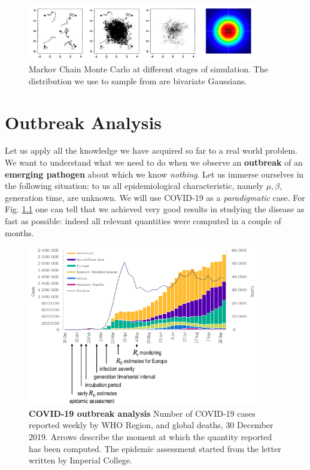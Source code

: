 \documentclass[../main/main.tex]{subfiles}
\begin{document}
\begin{figure}[h!]
\centering
\includegraphics[width=0.90\textwidth]{../lessons/image/21/image04.png}
\caption{\label{fig:21_04} Markov Chain Monte Carlo at different stages of simulation. The distribution we use to sample from are bivariate Gaussians.}
\end{figure}














\chapter{Outbreak Analysis}

Let us apply all the knowledge we have acquired so far to a real world problem. We want to understand what we need to do when we observe an \textbf{outbreak} of an \textbf{emerging pathogen} about which we know \textit{nothing}. Let us immerse ourselves in the following situation: to us all epidemiological characteristic, namely $\mu,\beta$, generation time, are unknown. We will use COVID-19 as a \textit{paradigmatic} case. For Fig. \ref{fig:21_05} one can tell that we achieved very good results in studying the disease as fast as possible: indeed all relevant quantities were computed in a couple of months.

\begin{figure}[h!]
\centering
\includegraphics[width=0.90\textwidth]{../lessons/image/21/image05.png}
\caption{\label{fig:21_05} \textbf{COVID-19 outbreak analysis}
Number of COVID-19 cases reported weekly by WHO Region, and global deaths, 30 December 2019. Arrows describe the moment at which the quantity reported has been computed. The epidemic assessment started from the letter written by Imperial College.}
\end{figure}
\end{document}
